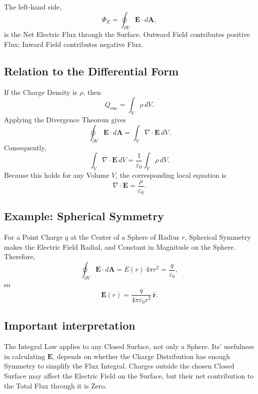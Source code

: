 \documentclass[a4paper, 10pt, onepage]{elegantbook}
\begin{document}
The left-hand side,
\[
\Phi_E=\oint_{\partial V}\mathbf{E}\cdot d\mathbf{A},
\]
is the Net Electric Flux through the Surface. Outward Field contributes positive Flux; Inward Field contributes negative Flux.

\subsection{Relation to the Differential Form}

If the Charge Density is \(\rho\), then
\[
Q_{\mathrm{enc}}=\int_V \rho\,dV.
\]
Applying the Divergence Theorem gives
\[
\oint_{\partial V}\mathbf{E}\cdot d\mathbf{A}
=\int_V\nabla\cdot\mathbf{E}\,dV.
\]
Consequently,
\[
\int_V\nabla\cdot\mathbf{E}\,dV
=\frac{1}{\varepsilon_0}\int_V\rho\,dV.
\]
Because this holds for any Volume \(V\), the corresponding local equation is
\[
\nabla\cdot\mathbf{E}=\frac{\rho}{\varepsilon_0}.
\]

\subsection{Example: Spherical Symmetry}

For a Point Charge \(q\) at the Center of a Sphere of Radius \(r\), Spherical Symmetry makes the Electric Field Radial, and Constant in Magnitude on the Sphere. Therefore,
\[
\oint_{\partial V}\mathbf{E}\cdot d\mathbf{A}
=E(r)\,4\pi r^2
=\frac{q}{\varepsilon_0},
\]
so
\[
\mathbf{E}(r)
=\frac{q}{4\pi\varepsilon_0r^2}\,\hat{\mathbf{r}}.
\]

\subsection{Important interpretation}

The Integral Law applies to any Closed Surface, not only a Sphere. Its' usefulness in calculating \(\mathbf{E}\), depends on whether the Charge Distribution has enough Symmetry to simplify the Flux Integral. Charges outside the chosen Closed Surface may affect the Electric Field on the Surface, but their net contribution to the Total Flux
through it is Zero.
\end{document}
